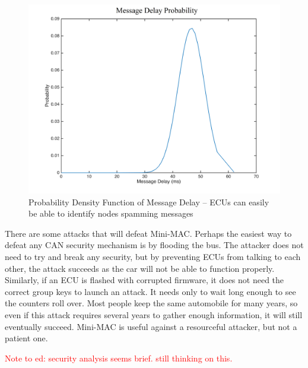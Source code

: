 	\selectfont
	\begin{figure}
		\centering
		\includegraphics[width=\columnwidth]{figures/pdf.png}
		\caption{{\selectfont Probability Density Function of Message Delay -- ECUs can easily be able to identify nodes spamming messages}}
	\end{figure}
	

There are some attacks that will defeat Mini-MAC. Perhaps the easiest way to defeat any CAN security mechanism is by flooding the bus. The attacker does not need to try and break any security, but by preventing ECUs from talking to each other, the attack succeeds as the car will not be able to function properly. Similarly, if an ECU is flashed with corrupted firmware, it does not need the correct group keys to launch an attack. It needs only to wait long enough to see the counters roll over. Most people keep the same automobile for many years, so even if this attack requires several years to gather enough information, it will still eventually succeed. Mini-MAC is useful against a resourceful attacker, but not a patient one.

\textcolor{red}{Note to ed: security analysis seems brief. still thinking on this.}